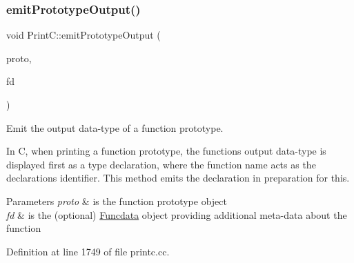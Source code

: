 \subsubsection{\texorpdfstring{emitPrototypeOutput()}{emitPrototypeOutput()}}
{\footnotesize\ttfamily void Print\+C\+::emit\+Prototype\+Output (\begin{DoxyParamCaption}\item[{const \mbox{\hyperlink{class_func_proto}{Func\+Proto}} $\ast$}]{proto,  }\item[{const \mbox{\hyperlink{class_funcdata}{Funcdata}} $\ast$}]{fd }\end{DoxyParamCaption})\hspace{0.3cm}{\ttfamily [protected]}}



Emit the output data-\/type of a function prototype. 

In C, when printing a function prototype, the function\textquotesingle{}s output data-\/type is displayed first as a type declaration, where the function name acts as the declaration\textquotesingle{}s identifier. This method emits the declaration in preparation for this. 
\begin{DoxyParams}{Parameters}
{\em proto} & is the function prototype object \\
\hline
{\em fd} & is the (optional) \mbox{\hyperlink{class_funcdata}{Funcdata}} object providing additional meta-\/data about the function \\
\hline
\end{DoxyParams}


Definition at line 1749 of file printc.\+cc.

